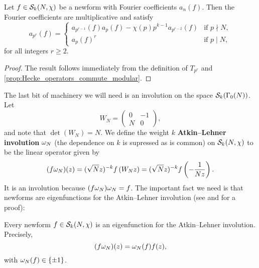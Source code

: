       \begin{proposition}\label{prop:newform_Fourier_coefficient_recurrence}
        Let $f \in \mathcal{S}_{k}(N,\chi)$ be a newform with Fourier coefficients $a_{n}(f)$. Then the Fourier coefficients are multiplicative and satisfy
        \[
          a_{p^{r}}(f) = \begin{cases} a_{p^{r-1}}(f)a_{p}(f)-\chi(p)p^{k-1}a_{p^{r-2}}(f) & \text{if $p \nmid N$}, \\ a_{p}(f)^{r} & \text{if $p \mid N$}, \end{cases}
        \]
        for all integers $r \ge 2$.
      \end{proposition}
      \begin{proof}
        The result follows immediately from the definition of $T_{p^{r}}$ and \cref{prop:Hecke_operators_commute_modular}.
      \end{proof}
      
      The last bit of machinery we will need is an involution on the space $\mathcal{S}_{k}(\Gamma_{0}(N))$. Let
      \[
        W_{N} = \begin{pmatrix} 0 & -1 \\ N & 0 \end{pmatrix},
      \]
      and note that $\det(W_{N}) = N$. We define the weight $k$ \textbf{Atkin–Lehner involution} $\omega_{N}$ (the dependence on $k$ is supressed as is common) on $\mathcal{S}_{k}(N,\chi)$ to be the linear operator given by
      \[
        (f\omega_{N})(z) = (\sqrt{N}z)^{-k}f\left(W_{N}z\right) = (\sqrt{N}z)^{-k}f\left(-\frac{1}{Nz}\right).
      \]
      It is an involution because $(f\omega_{N})\omega_{N} = f$. The important fact we need is that newforms are eigenfunctions for the Atkin–Lehner involution (see \cite{miyake1989modular} and \cite{diamond2005first} for a proof):

      \begin{proposition}\label{prop:Atkin_Lehner_involution_preserves_subspaces}
        Every newform $f \in \mathcal{S}_{k}(N,\chi)$ is an eigenfunction for the Atkin–Lehner involution. Precisely,
        \[
          (f\omega_{N})(z) = \omega_{N}(f)f(z),
        \]
        with $\omega_{N}(f) \in \{\pm1\}$.
      \end{proposition}
